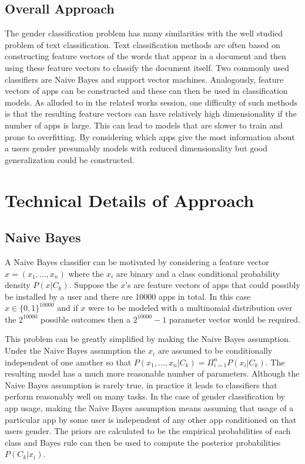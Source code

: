 \documentclass[10pt,twocolumn,letterpaper]{article}
\begin{document}
\subsection{Overall Approach}

The gender classification problem has many similarities with the well studied problem of text classification.  Text classification methods are often based on constructing feature vectors of the words that appear in a document and then using these feature vectors to classify the document itself.  Two commonly used classifiers are Naive Bayes and support vector machines.  Analogously, feature vectors of apps can be constructed and these can then be used in classification models.  As alluded to in the related works session, one difficulty of such methods is that the resulting feature vectors can have relatively high dimensionality if the number of apps is large.  This can lead to models that are slower to train and prone to overfitting.  By considering which apps give the most information about a users gender presumably models with reduced dimensionality but good generalization could be constructed.  

\section{Technical Details of Approach}

\subsection{Naive Bayes}

A Naive Bayes classifier can be motivated by considering a feature vector $x = (x_1, ... , x_n)$ where the $x_i$ are binary and a class conditional probability density $P(x|C_k)$.  Suppose the $x$'s are feature vectors of apps that could possibly be installed by a user and there are 10000 apps in total.  In this case $x \in \{0,1\}^{10000}$ and if $x$ were to be modeled with a multinomial distribution over the $2^{10000}$ possible outcomes then a $2^{10000} - 1$ parameter vector would be required.  

This problem can be greatly simplified by making the Naive Bayes assumption.  Under the Naive Bayes assumption the $x_i$ are assumed to be conditionally independent of one another so that $P(x_1,...,x_n|C_k) = \Pi_{i=1}^n P(x_i|C_k)$.  The resulting model has a much more reasonable number of parameters.  Although the Naive Bayes assumption is rarely true, in practice it leads to classifiers that perform reasonably well on many tasks.  In the case of gender classification by app usage, making the Naive Bayes assumption means assuming that usage of a particular app by some user is independent of any other app conditioned on that users gender.  The priors are calculated to be the empirical probabilities of each class and Bayes rule can then be used to compute the posterior probabilities $P(C_k|x_i)$.  
\end{document}
